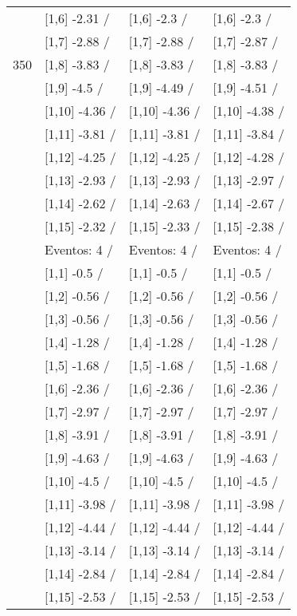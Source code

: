 \begin{table}
\begin{tabular}[t]{llll}
 & {}[1,6] -2.31  / & {}[1,6] -2.3  / & {}[1,6] -2.3  /\\
 & {}[1,7] -2.88  / & {}[1,7] -2.88  / & {}[1,7] -2.87  /\\
350 & {}[1,8] -3.83  / & {}[1,8] -3.83  / & {}[1,8] -3.83  /\\
\addlinespace
 & {}[1,9] -4.5  / & {}[1,9] -4.49  / & {}[1,9] -4.51  /\\
 & {}[1,10] -4.36  / & {}[1,10] -4.36  / & {}[1,10] -4.38  /\\
 & {}[1,11] -3.81  / & {}[1,11] -3.81  / & {}[1,11] -3.84  /\\
 & {}[1,12] -4.25  / & {}[1,12] -4.25  / & {}[1,12] -4.28  /\\
 & {}[1,13] -2.93  / & {}[1,13] -2.93  / & {}[1,13] -2.97  /\\
\addlinespace
 & {}[1,14] -2.62  / & {}[1,14] -2.63  / & {}[1,14] -2.67  /\\
 & {}[1,15] -2.32  / & {}[1,15] -2.33  / & {}[1,15] -2.38  /\\
 & Eventos:  4 / & Eventos:  4 / & Eventos:  4 /\\
 & {}[1,1] -0.5  / & {}[1,1] -0.5  / & {}[1,1] -0.5  /\\
 & {}[1,2] -0.56  / & {}[1,2] -0.56  / & {}[1,2] -0.56  /\\
\addlinespace
 & {}[1,3] -0.56  / & {}[1,3] -0.56  / & {}[1,3] -0.56  /\\
 & {}[1,4] -1.28  / & {}[1,4] -1.28  / & {}[1,4] -1.28  /\\
 & {}[1,5] -1.68  / & {}[1,5] -1.68  / & {}[1,5] -1.68  /\\
 & {}[1,6] -2.36  / & {}[1,6] -2.36  / & {}[1,6] -2.36  /\\
 & {}[1,7] -2.97  / & {}[1,7] -2.97  / & {}[1,7] -2.97  /\\
\addlinespace
500 & {}[1,8] -3.91  / & {}[1,8] -3.91  / & {}[1,8] -3.91  /\\
 & {}[1,9] -4.63  / & {}[1,9] -4.63  / & {}[1,9] -4.63  /\\
 & {}[1,10] -4.5  / & {}[1,10] -4.5  / & {}[1,10] -4.5  /\\
 & {}[1,11] -3.98  / & {}[1,11] -3.98  / & {}[1,11] -3.98  /\\
 & {}[1,12] -4.44  / & {}[1,12] -4.44  / & {}[1,12] -4.44  /\\
\addlinespace
 & {}[1,13] -3.14  / & {}[1,13] -3.14  / & {}[1,13] -3.14  /\\
 & {}[1,14] -2.84  / & {}[1,14] -2.84  / & {}[1,14] -2.84  /\\
 & {}[1,15] -2.53  / & {}[1,15] -2.53  / & {}[1,15] -2.53  /\\
\bottomrule
\end{tabular}
\end{table}
